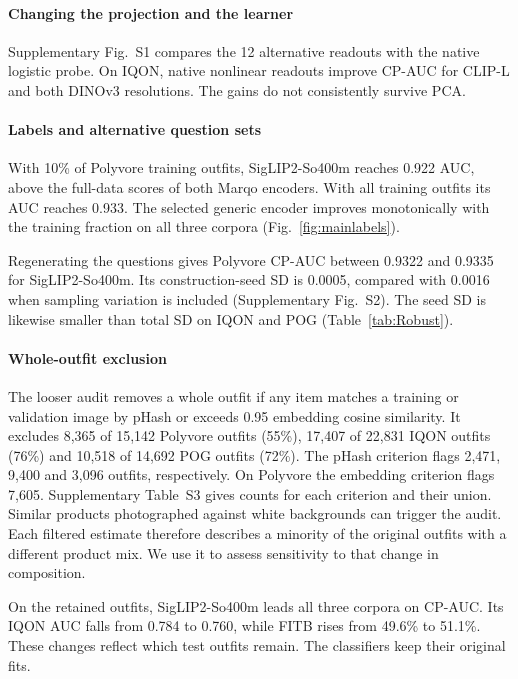 \paragraph{Changing the projection and the learner}
Supplementary Fig.~S1 compares the 12 alternative readouts with the native logistic probe. On IQON, native nonlinear readouts improve CP-AUC for CLIP-L and both DINOv3 resolutions. The gains do not consistently survive PCA.

\paragraph{Labels and alternative question sets}
With 10\% of Polyvore training outfits, SigLIP2-So400m reaches 0.922 AUC, above the full-data scores of both Marqo encoders. With all training outfits its AUC reaches 0.933. The selected generic encoder improves monotonically with the training fraction on all three corpora (Fig.~\ref{fig:mainlabels}).

Regenerating the questions gives Polyvore CP-AUC between 0.9322 and 0.9335 for SigLIP2-So400m. Its construction-seed SD is 0.0005, compared with 0.0016 when sampling variation is included (Supplementary Fig.~S2). The seed SD is likewise smaller than total SD on IQON and POG (Table~\ref{tab:Robust}).
\showRobust

\paragraph{Whole-outfit exclusion}
The looser audit removes a whole outfit if any item matches a training or validation image by pHash or exceeds 0.95 embedding cosine similarity. It excludes 8,365 of 15,142 Polyvore outfits (55\%), 17,407 of 22,831 IQON outfits (76\%) and 10,518 of 14,692 POG outfits (72\%). The pHash criterion flags 2,471, 9,400 and 3,096 outfits, respectively. On Polyvore the embedding criterion flags 7,605. Supplementary Table~S3 gives counts for each criterion and their union. Similar products photographed against white backgrounds can trigger the audit. Each filtered estimate therefore describes a minority of the original outfits with a different product mix. We use it to assess sensitivity to that change in composition.

On the retained outfits, SigLIP2-So400m leads all three corpora on CP-AUC. Its IQON AUC falls from 0.784 to 0.760, while FITB rises from 49.6\% to 51.1\%. These changes reflect which test outfits remain. The classifiers keep their original fits.
